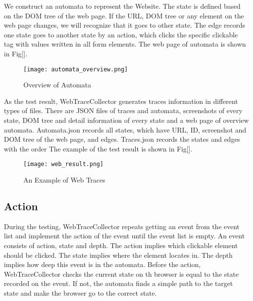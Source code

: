 We construct an automata to represent the Website.
The state is defined based on the DOM tree of the web page.
If the URL, DOM tree or any element on the web page changes, we will recognize that it goes to other state.
The edge records one state goes to another state by an action,
which clicks the specific clickable tag with values written in all form elements.
The web page of automata is shown in Fig[].

\begin{figure}[h]
	\graphicspath{{pic/}}
	\begin{center}
		\texttt{[image: automata\_overview.png]}
	\end{center}
	\caption{ Overview of Automata }
	\label{AutomataOverview}
\end{figure}

As the test result, WebTraceCollector generates traces information in different types of files. 
There are JSON files of traces and automata, screenshots of every state, DOM tree and detail information of every state and a web page of overview automata.
Automata.json records all states, which have URL, ID, screenshot and DOM tree of the web page, and edges.
Traces.json records the states and edges with the order
The example of the test result is shown in Fig[].

\begin{figure}[h]
	\graphicspath{{pic/}}
	\begin{center}
		\texttt{[image: web\_result.png]}
	\end{center}
	\caption{An Example of Web Traces }
	\label{TestResult}
\end{figure}


\subsection{Action}

During the testing, WebTraceCollector repeats getting an event from the event list and implement the action of the event until the event list is empty.
An event consists of action, state and depth.
The action implies which clickable element should be clicked.
The state implies where the element locates in.
The depth implies how deep this event is in the automata.
Before the action, WebTraceCollector checks the current state on th browser is equal to the state recorded on the event.
If not, the automata finds a simple path to the target state and make the browser go to the correct state.

